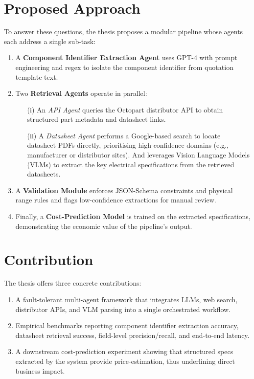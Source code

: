 \section{Proposed Approach }
To answer these questions, the thesis proposes a modular pipeline whose agents each address a single sub-task:  
\begin{enumerate}
  \item A \textbf{Component Identifier Extraction Agent} uses GPT-4 with prompt engineering and regex to isolate the component identifier from quotation template text.  
  \item Two \textbf{Retrieval Agents} operate in parallel:
    \begin{itemize}
      \item[(i)] An \emph{API Agent} queries the Octopart distributor API to obtain structured part metadata and datasheet links.
      \item[(ii)] A \emph{Datasheet Agent} performs a Google-based search to locate datasheet PDFs directly, prioritising high-confidence domains (e.g., manufacturer or distributor sites). And leverages Vision Language Models (VLMs) to extract the key electrical specifications from the retrieved datasheets.
    \end{itemize}
  \item A \textbf{Validation Module} enforces JSON-Schema constraints and physical range rules and flags low-confidence extractions for manual review.  
  \item Finally, a \textbf{Cost-Prediction Model} is trained on the extracted specifications, demonstrating the economic value of the pipeline's output.
\end{enumerate}

\section{Contribution }
The thesis offers three concrete contributions:
\begin{enumerate}
  \item A fault-tolerant multi-agent framework that integrates LLMs, web search, distributor APIs, and VLM parsing into a single orchestrated workflow.  
  \item Empirical benchmarks reporting component identifier extraction accuracy, datasheet retrieval success, field-level precision/recall, and end-to-end latency.  
  \item A downstream cost-prediction experiment showing that structured specs extracted by the system provide price-estimation, thus underlining direct business impact.
\end{enumerate}

